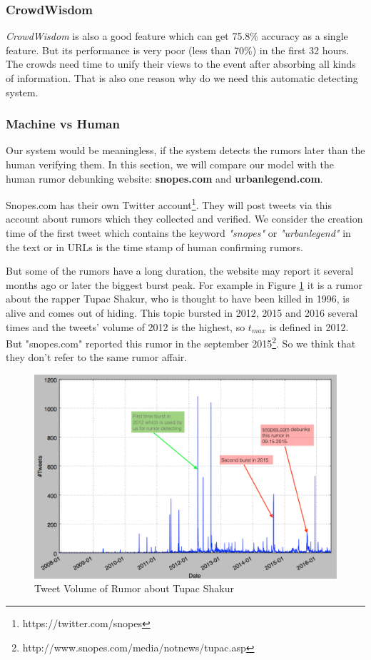  \subsubsection{CrowdWisdom} 
\emph{CrowdWisdom} is also a good feature which can get 75.8\% accuracy as a single feature. But its performance is very poor (less than 70\%) in the first 32 hours. The crowds need time to unify their views to the event after absorbing all kinds of information. That is also one reason why do we need this automatic detecting system. 

 \subsubsection{Machine vs Human} 
 Our system would be meaningless, if the system detects the rumors later than the human verifying them. In this section, we will compare our model with the human rumor debunking website: \textbf{snopes.com} and  \textbf{urbanlegend.com}. 
 
 Snopes.com has their own Twitter account\footnote{https://twitter.com/snopes}. They will post tweets via this account about rumors which they collected and verified. We consider the creation time of the first tweet which contains the keyword \emph{"snopes"} or \emph{"urbanlegend"} in the text or in URLs is the time stamp of human confirming rumors. 


But some of the rumors have a long duration, the website may report it several months ago or later the biggest burst peak. For example in Figure \ref{fig:Multipike} it is a rumor about the rapper Tupac Shakur, who is thought to have been killed in 1996, is alive and comes out of hiding. This topic bursted in 2012, 2015 and 2016 several times and the tweets' volume of 2012 is the highest, so $t_{max}$ is defined in 2012. But "snopes.com" reported this rumor in the september 2015\footnote{http://www.snopes.com/media/notnews/tupac.asp}. So we think that they don't refer to the same rumor affair.
  \begin{figure}[!h]
\centering
\includegraphics[width=0.8\columnwidth]{images/mutipikehiding.png}
\caption{Tweet Volume of Rumor about Tupac Shakur}
\label{fig:Multipike}
\end{figure}   
   
